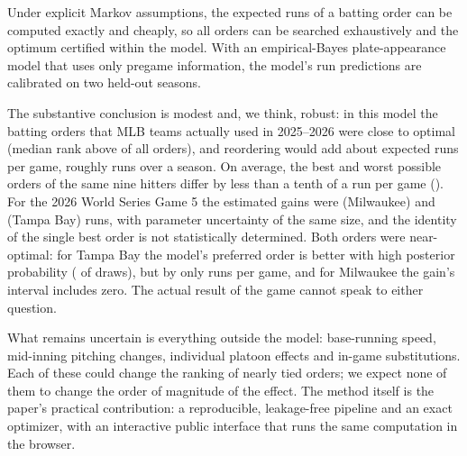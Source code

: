 Under explicit Markov assumptions, the expected runs of a batting order can be computed exactly and
cheaply, so all orders can be searched exhaustively and the optimum certified within the model.
With an empirical-Bayes plate-appearance model that uses only pregame information, the model's run
predictions are calibrated on two held-out seasons.

The substantive conclusion is modest and, we think, robust: in this model the batting orders that
MLB teams actually used in 2025--2026 were close to optimal (median rank above \EfourbPctMedian{}
of all orders), and reordering would add about \EfourbUpliftMean{} expected runs per game, roughly
\EfourbUpliftSeason{} runs over a season. On average, the best and worst possible orders of the
same nine hitters differ by less than a tenth of a run per game (\EfourbSpread{}). For the 2026 World Series Game 5 the
estimated gains were \RefUpliftAway{} (Milwaukee) and \RefUpliftHome{} (Tampa Bay) runs, with
parameter uncertainty of the same size, and the identity of the single best order is not
statistically determined. Both orders were near-optimal: for Tampa Bay the model's preferred order is better
with high posterior probability (\RefPBetterHome{} of draws), but by only \RefUpliftHome{} runs per
game, and for Milwaukee the gain's interval includes zero. The actual result of the game cannot speak
to either question.

What remains uncertain is everything outside the model: base-running speed, mid-inning pitching
changes, individual platoon effects and in-game substitutions. Each of these could change the
ranking of nearly tied orders; we expect none of them to change the order of magnitude of the
effect. The method itself is the paper's practical contribution: a reproducible, leakage-free
pipeline and an exact optimizer, with an interactive public interface that runs the same
computation in the browser.
